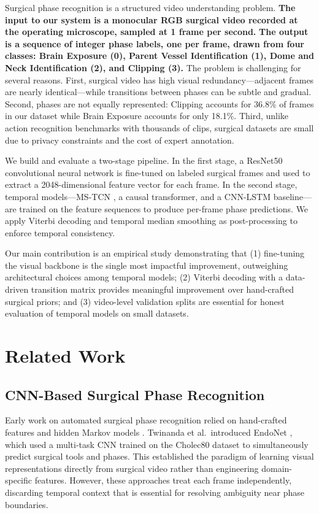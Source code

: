 \documentclass[10pt,twocolumn]{article}
\begin{document}
Surgical phase recognition is a structured video understanding problem. \textbf{The input to our system is a monocular RGB surgical video recorded at the operating microscope, sampled at 1 frame per second.} \textbf{The output is a sequence of integer phase labels, one per frame, drawn from four classes: Brain Exposure (0), Parent Vessel Identification (1), Dome and Neck Identification (2), and Clipping (3).} The problem is challenging for several reasons. First, surgical video has high visual redundancy—adjacent frames are nearly identical—while transitions between phases can be subtle and gradual. Second, phases are not equally represented: Clipping accounts for 36.8\% of frames in our dataset while Brain Exposure accounts for only 18.1\%. Third, unlike action recognition benchmarks with thousands of clips, surgical datasets are small due to privacy constraints and the cost of expert annotation.

We build and evaluate a two-stage pipeline. In the first stage, a ResNet50 convolutional neural network is fine-tuned on labeled surgical frames and used to extract a 2048-dimensional feature vector for each frame. In the second stage, temporal models—MS-TCN \cite{farha2019mstcn}, a causal transformer, and a CNN-LSTM baseline—are trained on the feature sequences to produce per-frame phase predictions. We apply Viterbi decoding and temporal median smoothing as post-processing to enforce temporal consistency.

Our main contribution is an empirical study demonstrating that (1) fine-tuning the visual backbone is the single most impactful improvement, outweighing architectural choices among temporal models; (2) Viterbi decoding with a data-driven transition matrix provides meaningful improvement over hand-crafted surgical priors; and (3) video-level validation splits are essential for honest evaluation of temporal models on small datasets.

\section{Related Work}

\subsection{CNN-Based Surgical Phase Recognition}

Early work on automated surgical phase recognition relied on hand-crafted features and hidden Markov models \cite{padoy2012statistical}. Twinanda et al.\ introduced EndoNet \cite{twinanda2016endonet}, which used a multi-task CNN trained on the Cholec80 dataset \cite{twinanda2016endonet} to simultaneously predict surgical tools and phases. This established the paradigm of learning visual representations directly from surgical video rather than engineering domain-specific features. However, these approaches treat each frame independently, discarding temporal context that is essential for resolving ambiguity near phase boundaries.
\end{document}

